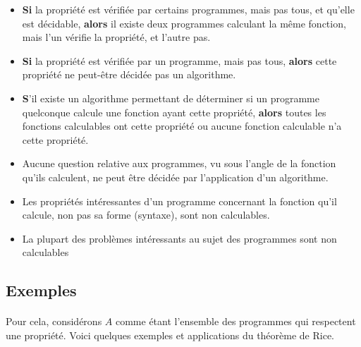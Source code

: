 \begin{itemize}
	\item \textbf{Si} la propriété est vérifiée par certains programmes, mais pas tous,
		et qu'elle est décidable, \textbf{alors} il existe deux programmes calculant la
		même fonction, mais l'un vérifie la propriété, et l'autre pas.

	\item \textbf{Si} la propriété est vérifiée par un programme, mais pas tous,
		\textbf{alors} cette propriété ne peut-être décidée pas un algorithme.

	\item \textbf{S}'il existe un algorithme permettant de déterminer si un
		programme quelconque calcule une fonction ayant cette propriété,
		\textbf{alors} toutes les fonctions calculables ont cette propriété ou
		aucune fonction calculable n'a cette propriété.

	\item Aucune question relative aux programmes, vu sous l'angle de la
		fonction qu'ils calculent, ne peut être décidée par
		l'application d'un algorithme.

	\item Les propriétés intéressantes d'un programme concernant la
		fonction qu'il calcule, non pas sa forme (syntaxe), sont non calculables.

	\item La plupart des problèmes intéressants au sujet des programmes sont non calculables
\end{itemize}

\subsection{Exemples}

\paragraph{}Pour cela, considérons $A$ comme étant l'ensemble des programmes qui
respectent une propriété. Voici quelques exemples et applications du théorème de Rice.

